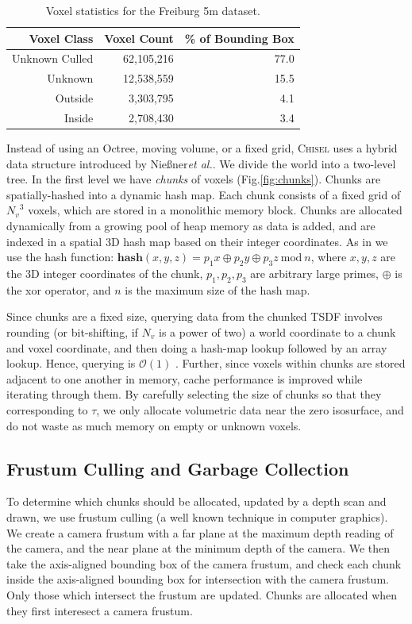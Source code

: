 \documentclass[conference]{IEEEtran}
\newcommand{\figref}[1]{Fig.\ref{#1}}
\newcommand{\etal}{\textit{et al.}\xspace}
\newcommand{\TSDF}{TSDF\xspace}
\newcommand{\Niessner}{Nie{\ss}ner\xspace}
\newcommand{\chisel}{\textsc{Chisel}\xspace}
\begin{document}
\begin{table}[t!]
\centering
	\begin{tabular} {rrr}
	\toprule
	Voxel Class & Voxel Count & \% of Bounding Box \\ 
	\midrule
	Unknown Culled & 62,105,216 & 77.0 \\ 
	Unknown & 12,538,559 & 15.5 \\ 
	Outside & 3,303,795 & 4.1 \\ 
	Inside & 2,708,430 & 3.4 \\ 
	\bottomrule
	\end{tabular}
	\caption{Voxel statistics for the Freiburg 5m dataset.}
	\label{table:volumecount}  
\end{table}

Instead of using an Octree, moving volume, or a fixed grid,  \chisel uses a
hybrid data structure introduced by \Niessner \etal \cite{NiessnerHashing}. We
divide the world into a two-level tree. In the first level we have \emph{chunks} of
voxels (\figref{fig:chunks}). Chunks are spatially-hashed \cite{SpatialHashing}
into a dynamic hash map.  Each chunk consists of a fixed grid of ${N_v}^3$
voxels, which are stored in a monolithic memory block. Chunks are allocated
dynamically from a growing pool of heap memory as data is added, and are
indexed in a spatial 3D hash map based on their integer
coordinates.  As in \cite{SpatialHashing, NiessnerHashing} we use the hash
function:  $ \textbf{hash}(x, y, z) = p_1 x\oplus p_2 y \oplus p_3 z
~\text{mod}~n $, where $x, y, z$ are the 3D integer coordinates of the chunk,
$p_1, p_2, p_3$ are arbitrary large primes, $\oplus$ is the xor operator, and $n$ is
the maximum size of the hash map.

Since chunks are a fixed size, querying data from the chunked \TSDF involves
rounding (or bit-shifting, if $N_v$ is a power of two) a world coordinate to a
chunk and voxel coordinate, and then doing a hash-map lookup followed by an
array lookup. Hence, querying is $\mathcal{O}(1)$ \cite{NiessnerHashing}.
Further, since voxels within chunks are stored adjacent to one another in
memory, cache performance is improved while iterating through them. By carefully
selecting the size of chunks so that they corresponding to $\tau$, we only
allocate volumetric data near the zero isosurface, and do not waste as much
memory on empty or unknown voxels.

\subsection{Frustum Culling and Garbage Collection}
\label{section:frustum}
To determine which chunks should be allocated, updated by a depth scan and
drawn, we use frustum culling (a well known technique in computer graphics). We 
create a camera frustum with a far plane at the maximum depth reading of the camera, and
the near plane at the minimum depth of the camera. We then take the 
axis-aligned bounding box of the camera frustum, and check each chunk inside the
axis-aligned bounding box for intersection with the camera frustum. Only those
which intersect the frustum are updated. Chunks are allocated when they first
interesect a camera frustum.
\end{document}
